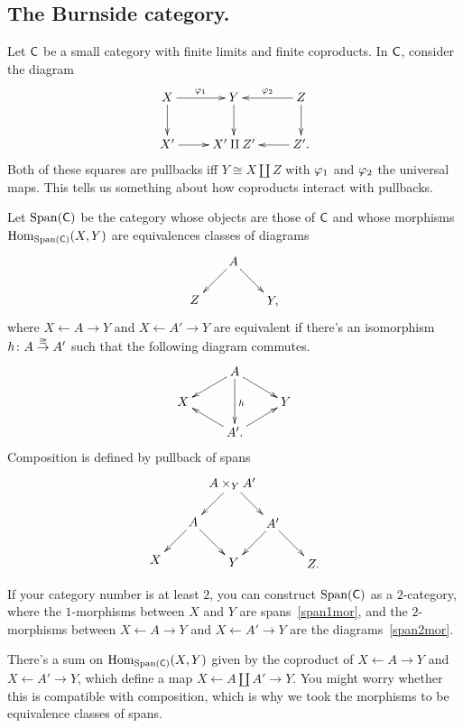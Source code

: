 \subsection*{The Burnside category.}
Let $\mathsf C$ be a small category with finite limits and finite coproducts. In $\mathsf C$, consider the diagram
\[\xymatrix{
	X\ar[r]^{\vp_1}\ar[d] & Y\ar[d] & Z\ar[d]\ar[l]_{\vp_2}\\
	X'\ar[r] & X'\amalg Z' & Z'.\ar[l]
}\]
Both of these squares are pullbacks iff $Y\cong X\amalg Z$ with $\varphi_1$ and $\varphi_2$ the universal maps. This tells
us something about how coproducts interact with pullbacks.
\begin{defn}
Let $\operatorname{Span}(\mathsf C)$ be the category whose objects are those of $\mathsf C$ and whose morphisms $\operatorname{Hom}_{\operatorname{Span}(\mathsf C)}(X,Y)$ are
equivalences classes of diagrams
\begin{equation}
\label{span1mor}
\begin{gathered}
\xymatrix@dr{
	A\ar[r]\ar[d] & Y,\\
	Z
}
\end{gathered}
\end{equation}
where $X\gets A\to Y$ and $X\gets A'\to Y$ are equivalent if there's an isomorphism $h\colon A\stackrel\cong\to A'$ such that
the following diagram commutes.
\begin{equation}
\label{span2mor}
\begin{gathered}
\xymatrix@R=0.4cm{
	& A\ar[dr]\ar[dl]\ar[dd]^h\\
	X && Y\\
	& A'.\ar[ul]\ar[ur]
}
\end{gathered}
\end{equation}
Composition is defined by pullback of spans
\[\xymatrix@dr{
	A\times_Y A'\ar[r]\ar[d] & A'\ar[r]\ar[d] & Z.\\
	A\ar[r]\ar[d] & Y\\
	X
}\]
\end{defn}
\begin{rem} %
If your category number is at least $2$, you can construct $\operatorname{Span}(\mathsf C)$ as a $2$-category, where the $1$-morphisms
between $X$ and $Y$ are spans~\eqref{span1mor}, and the $2$-morphisms between $X\gets A\to Y$ and $X\gets A'\to Y$
are the diagrams~\eqref{span2mor}.
\end{rem}
There's a sum on $\operatorname{Hom}_{\operatorname{Span}(\mathsf C)}(X,Y)$ given by the coproduct of $X\gets A\to Y$ and $X\gets A'\to Y$, which
define a map $X\gets A\amalg A'\to Y$. You might worry whether this is compatible with composition, which is why
we took the morphisms to be equivalence classes of spans.

